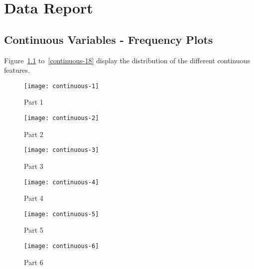 \cleardoublepage
\appendix
\chapter{Data Report}

\section{Continuous Variables - Frequency Plots}
\label{sec:continuous}
Figure~\ref{continuous-1} to~\ref{continuous-18} display the distribution of the different continuous features. 

\begin{figure}[ht]
    \begin{center}
    \texttt{[image: continuous-1]}
    \end{center}
    \caption{Part 1}
    \label{continuous-1}
\end{figure}

\begin{figure}[ht]
    \begin{center}
    \texttt{[image: continuous-2]}
    \end{center}
    \caption{Part 2}
    \label{continuous-2}
\end{figure}

\begin{figure}[ht]
    \begin{center}
    \texttt{[image: continuous-3]}
    \end{center}
    \caption{Part 3}
    \label{continuous-3}
\end{figure}

\begin{figure}[ht]
    \begin{center}
    \texttt{[image: continuous-4]}
    \end{center}
    \caption{Part 4}
    \label{continuous-4}
\end{figure}

\begin{figure}[ht]
    \begin{center}
    \texttt{[image: continuous-5]}
    \end{center}
    \caption{Part 5}
    \label{continuous-5}
\end{figure}

\begin{figure}[ht]
    \begin{center}
    \texttt{[image: continuous-6]}
    \end{center}
    \caption{Part 6}
    \label{continuous-6}
\end{figure}

